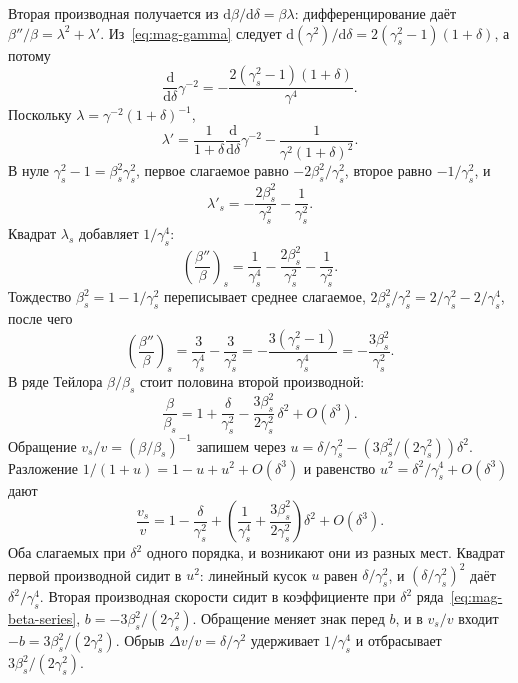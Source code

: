 Вторая производная получается из $\mathrm{d}\beta/\mathrm{d}\delta=\beta\lambda$: дифференцирование даёт $\beta''/\beta=\lambda^2+\lambda'$. Из~\eqref{eq:mag-gamma} следует $\mathrm{d}(\gamma^2)/\mathrm{d}\delta=2(\gamma_s^2-1)(1+\delta)$, а потому
\begin{equation}
\label{eq:mag-dgamma}
\frac{\mathrm{d}}{\mathrm{d}\delta}\gamma^{-2}
=-\frac{2(\gamma_s^2-1)(1+\delta)}{\gamma^4}.
\end{equation}
Поскольку $\lambda=\gamma^{-2}(1+\delta)^{-1}$,
\begin{equation}
\label{eq:mag-lamp}
\lambda'
=\frac{1}{1+\delta}\frac{\mathrm{d}}{\mathrm{d}\delta}\gamma^{-2}
-\frac{1}{\gamma^2(1+\delta)^2}.
\end{equation}
В нуле $\gamma_s^2-1=\beta_s^2\gamma_s^2$, первое слагаемое равно $-2\beta_s^2/\gamma_s^2$, второе равно $-1/\gamma_s^2$, и
\begin{equation}
\label{eq:mag-lamp-s}
\lambda'_s=-\frac{2\beta_s^2}{\gamma_s^2}-\frac{1}{\gamma_s^2}.
\end{equation}
Квадрат $\lambda_s$ добавляет $1/\gamma_s^4$:
\begin{equation}
\label{eq:mag-beta-pp-raw}
\left(\frac{\beta''}{\beta}\right)_{\!s}
=\frac{1}{\gamma_s^4}-\frac{2\beta_s^2}{\gamma_s^2}-\frac{1}{\gamma_s^2}.
\end{equation}
Тождество $\beta_s^2=1-1/\gamma_s^2$ переписывает среднее слагаемое, $2\beta_s^2/\gamma_s^2=2/\gamma_s^2-2/\gamma_s^4$, после чего
\begin{equation}
\label{eq:mag-beta-pp}
\left(\frac{\beta''}{\beta}\right)_{\!s}
=\frac{3}{\gamma_s^4}-\frac{3}{\gamma_s^2}
=-\frac{3(\gamma_s^2-1)}{\gamma_s^4}
=-\frac{3\beta_s^2}{\gamma_s^2}.
\end{equation}
В ряде Тейлора $\beta/\beta_s$ стоит половина второй производной:
\begin{equation}
\label{eq:mag-beta-series}
\frac{\beta}{\beta_s}
=1+\frac{\delta}{\gamma_s^2}
-\frac{3\beta_s^2}{2\gamma_s^2}\,\delta^2
+O(\delta^3).
\end{equation}
Обращение $v_s/v=(\beta/\beta_s)^{-1}$ запишем через
$u=\delta/\gamma_s^2-(3\beta_s^2/(2\gamma_s^2))\delta^2$.
Разложение $1/(1+u)=1-u+u^2+O(\delta^3)$ и равенство $u^2=\delta^2/\gamma_s^4+O(\delta^3)$ дают
\begin{equation}
\label{eq:mag-vsv}
\frac{v_s}{v}
=1-\frac{\delta}{\gamma_s^2}
+\left(\frac{1}{\gamma_s^4}+\frac{3\beta_s^2}{2\gamma_s^2}\right)\delta^2
+O(\delta^3).
\end{equation}
Оба слагаемых при $\delta^2$ одного порядка, и возникают они из разных мест. Квадрат первой производной сидит в $u^2$: линейный кусок $u$ равен $\delta/\gamma_s^2$, и $(\delta/\gamma_s^2)^2$ даёт $\delta^2/\gamma_s^4$. Вторая производная скорости сидит в коэффициенте при $\delta^2$ ряда~\eqref{eq:mag-beta-series}, $b=-3\beta_s^2/(2\gamma_s^2)$. Обращение меняет знак перед $b$, и в $v_s/v$ входит $-b=3\beta_s^2/(2\gamma_s^2)$. Обрыв $\Delta v/v=\delta/\gamma^2$ удерживает $1/\gamma_s^4$ и отбрасывает $3\beta_s^2/(2\gamma_s^2)$.

